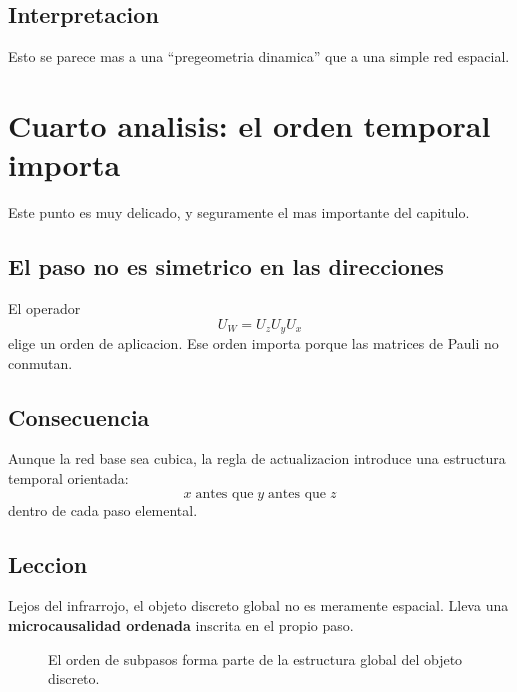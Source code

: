 \subsection{Interpretacion}
Esto se parece mas a una \enquote{pregeometria dinamica} que a una simple red espacial.

\section{Cuarto analisis: el orden temporal importa}
Este punto es muy delicado, y seguramente el mas importante del capitulo.

\subsection{El paso no es simetrico en las direcciones}
El operador
\begin{equation}
U_W = U_zU_yU_x
\end{equation}
elige un orden de aplicacion. Ese orden importa porque las matrices de Pauli no conmutan.

\subsection{Consecuencia}
Aunque la red base sea cubica, la regla de actualizacion introduce una estructura temporal orientada:
\begin{equation}
x \;\text{antes que}\; y \;\text{antes que}\; z
\end{equation}
dentro de cada paso elemental.

\subsection{Leccion}
Lejos del infrarrojo, el objeto discreto global no es meramente espacial. Lleva una \textbf{microcausalidad ordenada} inscrita en el propio paso.

\begin{figure}[h!]
\centering
{}
\caption{El orden de subpasos forma parte de la estructura global del objeto discreto.}
\end{figure}


